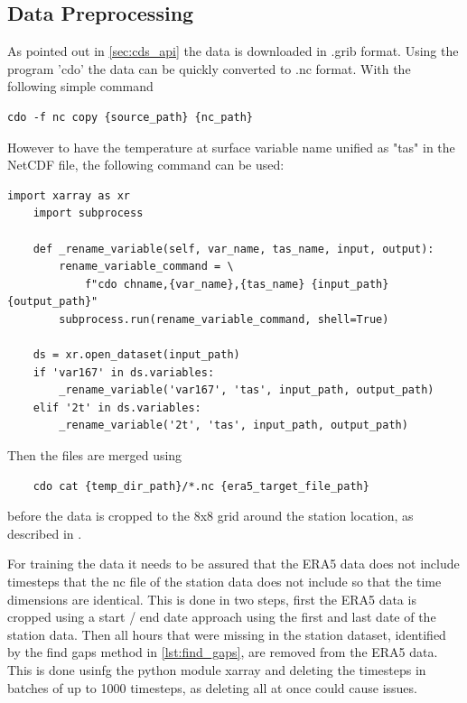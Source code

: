 \subsection{Data Preprocessing}

As pointed out in \autoref{sec:cds_api} the data is downloaded in .grib format. Using the program 'cdo' the data can be quickly converted to .nc format. With the following simple command

\begin{lstlisting}
cdo -f nc copy {source_path} {nc_path}
\end{lstlisting}

However to have the temperature at surface variable name unified as "tas" in the NetCDF file, the following command can be used:

\begin{lstlisting}[caption=Renaming Variable in NetCDF File, label=lst:rename_variable]
    import xarray as xr
    import subprocess

    def _rename_variable(self, var_name, tas_name, input, output):
        rename_variable_command = \
            f"cdo chname,{var_name},{tas_name} {input_path} {output_path}"
        subprocess.run(rename_variable_command, shell=True)
        
    ds = xr.open_dataset(input_path)
    if 'var167' in ds.variables:
        _rename_variable('var167', 'tas', input_path, output_path)
    elif '2t' in ds.variables:
        _rename_variable('2t', 'tas', input_path, output_path)

\end{lstlisting}

Then the files are merged using 

\begin{lstlisting}
    cdo cat {temp_dir_path}/*.nc {era5_target_file_path}
\end{lstlisting}

before the data is cropped to the 8x8 grid around the station location, as described in .

For training the data it needs to be assured that the ERA5 data does not include timesteps that the nc file of the station data does not include so that the time dimensions are identical. This is done in two steps, first the ERA5 data is cropped using a start / end date approach using the first and last date of the station data. Then all hours that were missing in the station dataset, identified by the find gaps method in \autoref{lst:find_gaps}, are removed from the ERA5 data. This is done usinfg the python module xarray and deleting the timesteps in batches of up to 1000 timesteps, as deleting all at once could cause issues.

